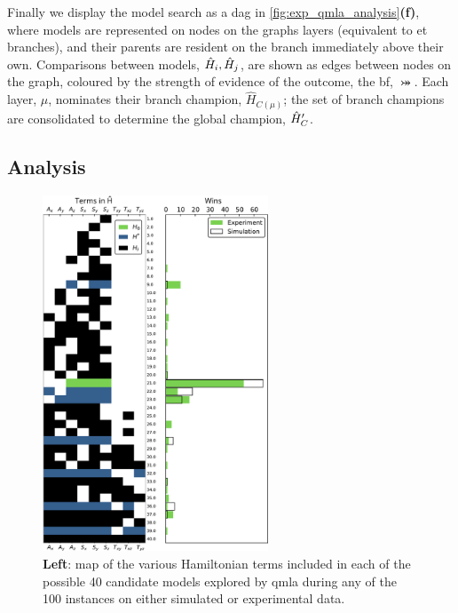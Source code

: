 Finally we display the model search as a \gls{dag} in \cref{fig:exp_qmla_analysis}\textbf{(f)}, 
    where models are represented on nodes on the graphs layers (equivalent to \gls{et} branches), 
    and their parents are resident on the branch immediately above their own.
Comparisons between models, $\hat{H}_i, \hat{H}_j$,  are shown as edges between nodes on the graph, 
    coloured by the strength of evidence of the outcome, the \gls{bf}, $\bij$. 
Each layer, $\mu$, nominates their branch champion, $\hat{H}_{C(\mu)}$;
    the set of branch champions are consolidated to determine the global champion, $\hat{H}^{\prime}_C$. 
\subsection{Analysis}\label{sec:exp_qmla_analysis}


\begin{figure}
    \begin{center}
        \includegraphics[width=0.6\textwidth]{experimental_study/figures/model_composition.pdf}
    \end{center}
    \caption[
        Models considered by \gls{qmla} for simulated/experimental  data, and their  \gls{win rate} s
    ]{
    \textbf{Left}: map of the various Hamiltonian terms included in each of the possible 40 candidate models explored by \gls{qmla}
    during any of the 100 \glspl{instance} on either simulated or experimental data.
}
\end{figure}
